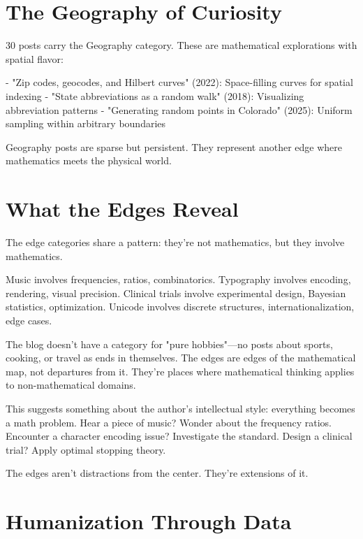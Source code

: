 \bigskip

\section*{The Geography of Curiosity}

30 posts carry the Geography category. These are mathematical explorations with spatial flavor:

- "Zip codes, geocodes, and Hilbert curves" (2022): Space-filling curves for spatial indexing
- "State abbreviations as a random walk" (2018): Visualizing abbreviation patterns
- "Generating random points in Colorado" (2025): Uniform sampling within arbitrary boundaries

Geography posts are sparse but persistent. They represent another edge where mathematics meets the physical world.

\bigskip

\section*{What the Edges Reveal}

The edge categories share a pattern: they're not mathematics, but they involve mathematics.

Music involves frequencies, ratios, combinatorics. Typography involves encoding, rendering, visual precision. Clinical trials involve experimental design, Bayesian statistics, optimization. Unicode involves discrete structures, internationalization, edge cases.

The blog doesn't have a category for "pure hobbies"—no posts about sports, cooking, or travel as ends in themselves. The edges are edges of the mathematical map, not departures from it. They're places where mathematical thinking applies to non-mathematical domains.

This suggests something about the author's intellectual style: everything becomes a math problem. Hear a piece of music? Wonder about the frequency ratios. Encounter a character encoding issue? Investigate the standard. Design a clinical trial? Apply optimal stopping theory.

The edges aren't distractions from the center. They're extensions of it.


\bigskip

\section*{Humanization Through Data}

